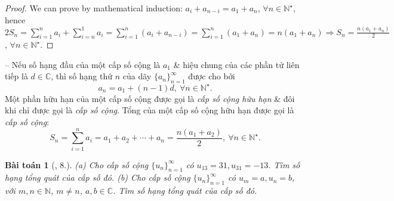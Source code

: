 \documentclass[oneside]{book}
\newtheorem{baitoan}{Bài toán}
\begin{document}
\begin{proof}
	We can prove by mathematical induction: $a_i + a_{n-i} = a_1 + a_n$, $\forall n\in\mathbb{N}^\star$, hence $2S_n = \sum_{i=1}^n a_i + \sum_{i=n}^1 a_i = \sum_{i=1}^n (a_i + a_{n-i}) = \sum_{i=1}^n (a_1 + a_n) = n(a_1 + a_n)\Rightarrow S_n = \frac{n(a_1 + a_n)}{2}$, $\forall n\in\mathbb{N}^\star$.
\end{proof}
-- Nếu số hạng đầu của một cấp số cộng là $a_1$ \& hiệu chung của các phần tử liên tiếp là $d\in\mathbb{C}$, thì số hạng thứ $n$ của dãy $\{a_n\}_{n=1}^\infty$ được cho bởi
\begin{equation*}
	a_n = a_1 + (n - 1)d,\ \forall n\in\mathbb{N}^\star.
\end{equation*}
Một phần hữu hạn của một cấp số cộng được gọi là {\it cấp số cộng hữu hạn} \& đôi khi chỉ được gọi là {\it cấp số cộng}. Tổng của một cấp số cộng hữu hạn được gọi là {\it cấp số cộng}:
\begin{equation*}
	S_n = \sum_{i=1}^n a_i = a_1 + a_2 + \cdots + a_n = \frac{n(a_1 + a_2)}{2},\ \forall n\in\mathbb{N}^\star.
\end{equation*}

\begin{baitoan}[\cite{TLCT_dai_so_giai_tich_11}, 8.]
	(a) Cho cấp số cộng $\{u_n\}_{n=1}^\infty$ có $u_{13} = 31,u_{31} = -13$. Tìm số hạng tổng quát của cấp số đó. (b) Cho cấp số cộng $\{u_n\}_{n=1}^\infty$ có $u_m = a,u_n = b$, với $m,n\in\mathbb{N}$, $m\ne n$, $a,b\in\mathbb{C}$. Tìm số hạng tổng quát của cấp số đó.
\end{baitoan}
\end{document}
